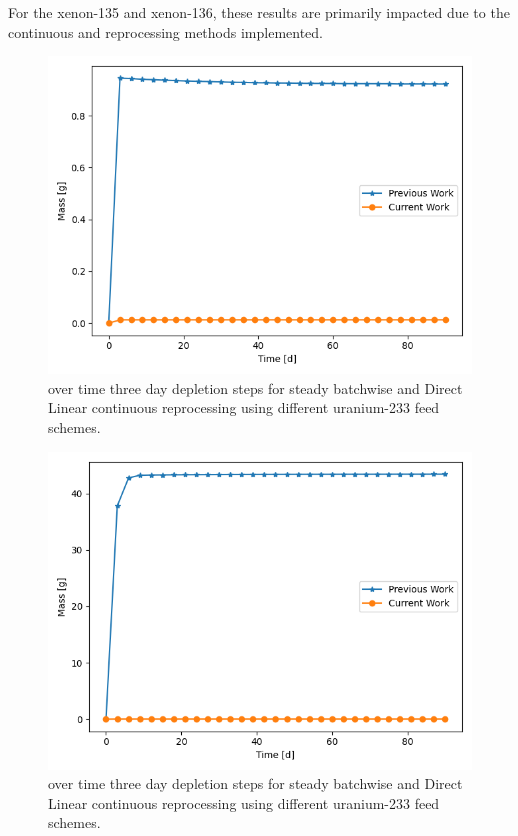 For the xenon-135 and xenon-136, these results are primarily impacted due to the continuous and reprocessing methods implemented. 

\begin{figure}[H]
  \centering
  \includegraphics[scale=0.5]{images/prev-cur-xe135.png}
  \caption{ over time three day depletion steps for steady batchwise and Direct Linear continuous reprocessing using different uranium-233 feed schemes.}
   \label{fig:prev-cur-xe135-plot}
\end{figure}

\begin{figure}[H]
  \centering
  \includegraphics[scale=0.5]{images/prev-cur-xe136.png}
  \caption{ over time three day depletion steps for steady batchwise and Direct Linear continuous reprocessing using different uranium-233 feed schemes.}
   \label{fig:prev-cur-xe136-plot}
\end{figure}

